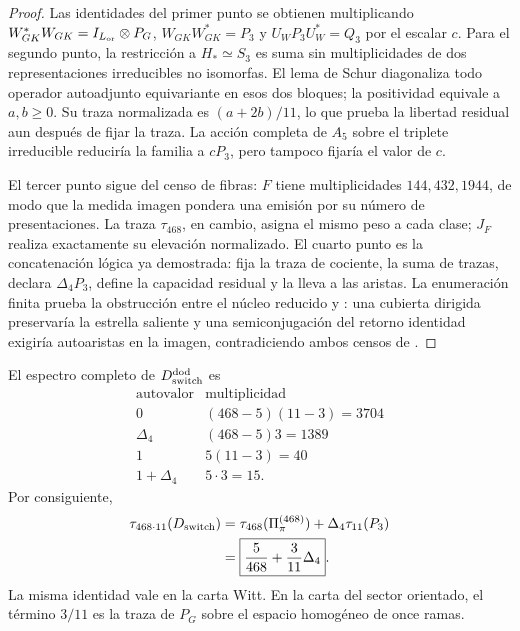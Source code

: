 \begin{proof}
Las identidades del primer punto se obtienen multiplicando
\(W_{GK}^{*}W_{GK}=I_{L_{\rm or}}\otimes P_G\),
\(W_{GK}W_{GK}^{*}=P_3\) y \(U_WP_3U_W^{*}=Q_3\) por el escalar \(c\).
Para el segundo punto, la restricción a \(H_*\simeq S_3\) es suma sin
multiplicidades de dos representaciones irreducibles no isomorfas. El lema de
Schur diagonaliza todo operador autoadjunto equivariante en esos dos bloques;
la positividad equivale a \(a,b\geq0\). Su traza normalizada es
\((a+2b)/11\), lo que prueba la libertad residual aun después de fijar la
traza. La acción completa de \(A_5\) sobre el triplete irreducible reduciría
la familia a \(cP_3\), pero tampoco fijaría el valor de \(c\).

El tercer punto sigue del censo de fibras: \(F\) tiene multiplicidades
\(144,432,1944\), de modo que la medida imagen pondera una emisión por su
número de presentaciones. La traza \(\tau_{468}\), en cambio, asigna el
mismo peso a cada clase; \(J_F\) realiza exactamente su elevación
normalizado. El cuarto punto es la concatenación lógica ya demostrada:
\HTr fija la traza de cociente, \HAdd la suma de trazas, \HDef declara
\(\Delta_4P_3\), \HRes define la capacidad residual y \HLoc la lleva a las aristas.
La enumeración finita prueba la obstrucción entre el núcleo reducido y
\Gtr: una cubierta dirigida preservaría la estrella saliente y una
semiconjugación del retorno identidad exigiría autoaristas en la imagen,
contradiciendo ambos censos de \Gtr.
\end{proof}

El espectro completo de \(D_{\rm switch}^{\rm dod}\) es
\[
\begin{array}{c|c}
\text{autovalor}&\text{multiplicidad}\\ \hline
0&(468-5)(11-3)=3704\\
\Delta_4&(468-5)3=1389\\
1&5(11-3)=40\\
1+\Delta_4&5\cdot3=15.
\end{array}
\]
Por consiguiente,
\[
\begin{aligned}
 \tau_{468\cdot11}(D_{\rm switch})
 &=\tau_{468}(\Pi_\pi^{(468)})+\Delta_4\tau_{11}(P_3)\\
 &=\boxed{\frac5{468}+\frac3{11}\Delta_4}.
\end{aligned}
\]
La misma identidad vale en la carta Witt. En la carta del sector orientado, el término
\(3/11\) es la traza de \(P_G\) sobre el espacio homogéneo de once ramas.

